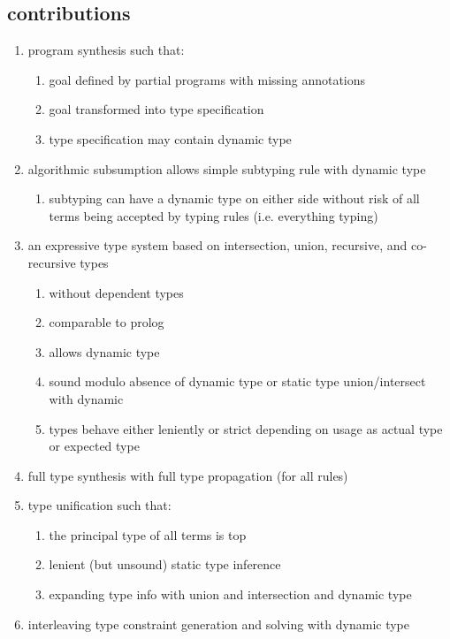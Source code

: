 \documentclass[sigplan,screen]{acmart}
\begin{document}
\subsection*{contributions}
\begin{enumerate}
  \item program synthesis such that:
    \begin{enumerate}
      \item goal defined by partial programs with missing annotations  
      \item goal transformed into type specification 
      \item type specification may contain dynamic type  
    \end{enumerate}
  \item algorithmic subsumption allows simple subtyping rule with dynamic type
    \begin{enumerate}
      \item subtyping can have a dynamic type on either side without risk of   
        all terms being accepted by typing rules (i.e. everything typing)
    \end{enumerate}
  \item an expressive type system 
    based on intersection, union, recursive, and co-recursive types
    \begin{enumerate}
      \item without dependent types 
      \item comparable to prolog 
      \item allows dynamic type 
      \item sound modulo absence of dynamic type 
        or static type union/intersect with dynamic
      \item types behave either leniently or strict depending on usage as actual type or expected type
    \end{enumerate}
  \item full type synthesis with full type propagation (for all rules)
  \item type unification such that: 
    \begin{enumerate}
      \item the principal type of all terms is top
      \item lenient (but unsound) static type inference
      \item expanding type info with union and intersection and dynamic type
    \end{enumerate}
  \item interleaving type constraint generation and solving with dynamic type 
\end{enumerate}
\end{document}
